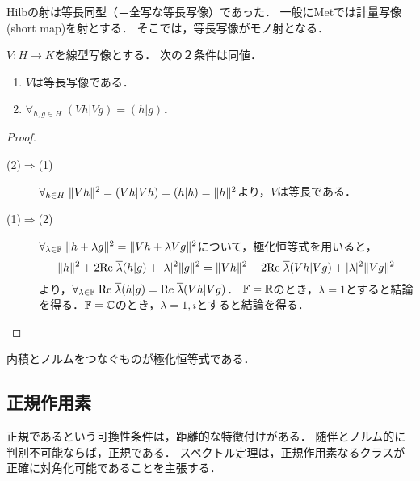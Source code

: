 \documentclass[uplatex,dvipdfmx]{jsreport}
\begin{document}
\begin{tcolorbox}[colframe=ForestGreen, colback=ForestGreen!10!white,breakable,colbacktitle=ForestGreen!40!white,coltitle=black,fonttitle=\bfseries\sffamily,
title=]
    Hilbの射は等長同型（＝全写な等長写像）であった．
    一般にMetでは計量写像(short map)を射とする．
    そこでは，等長写像がモノ射となる．
\end{tcolorbox}

\begin{proposition}[モノ射の内積による特徴付け]\label{prop-characterization-of-isometry}
    $V:H\to K$を線型写像とする．
    次の２条件は同値．
    \begin{enumerate}
        \item $V$は等長写像である．
        \item $\forall_{h,g\in H}\;(Vh|Vg)=(h|g)$．
    \end{enumerate}
\end{proposition}
\begin{proof}\mbox{}
    \begin{description}
        \item[(2)$\Rightarrow$(1)] $\forall_{h\in H}\;\|Vh\|^2=(Vh|Vh)=(h|h)=\|h\|^2$より，$V$は等長である．
        \item[(1)$\Rightarrow$(2)] $\forall_{\lambda\in\mathbb{F}}\;\|h+\lambda g\|^2=\|Vh+\lambda Vg\|^2$について，極化恒等式を用いると，
        \[\|h\|^2+2\mathrm{Re}\;\overline{\lambda}(h|g)+\lvert\lambda\rvert^2\|g\|^2=\|Vh\|^2+2\mathrm{Re}\;\overline{\lambda}(Vh|Vg)+\lvert\lambda\rvert^2\|Vg\|^2\]
        より，$\forall_{\lambda\in\mathbb{F}}\;\mathrm{Re}\;\overline{\lambda}(h|g)=\mathrm{Re}\;\overline{\lambda}(Vh|Vg)$．
        $\mathbb{F}=\mathbb{R}$のとき，$\lambda=1$とすると結論を得る．$\mathbb{F}=\mathbb{C}$のとき，$\lambda=1,i$とすると結論を得る．
    \end{description}
\end{proof}
\begin{remarks}
    内積とノルムをつなぐものが極化恒等式である．
\end{remarks}

\subsection{正規作用素}

\begin{tcolorbox}[colframe=ForestGreen, colback=ForestGreen!10!white,breakable,colbacktitle=ForestGreen!40!white,coltitle=black,fonttitle=\bfseries\sffamily,
title=]
    正規であるという可換性条件は，距離的な特徴付けがある．
    随伴とノルム的に判別不可能ならば，正規である．
    スペクトル定理は，正規作用素なるクラスが正確に対角化可能であることを主張する．
\end{tcolorbox}
\end{document}
